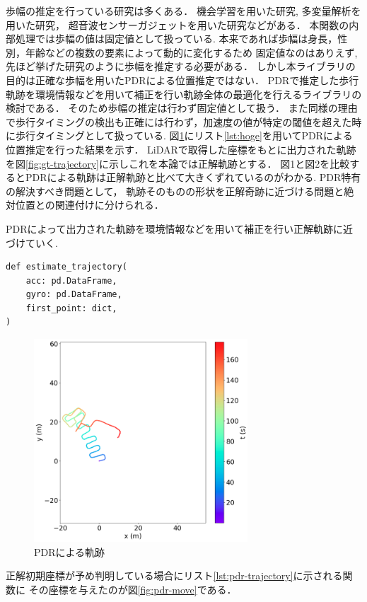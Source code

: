 \documentclass[Japanese]{dicomopapers}
\begin{document}
歩幅の推定を行っている研究は多くある．
機会学習を用いた研究\cite{stride-length-auto-learning},
多変量解析を用いた研究\cite{stride-length-multi}，
超音波センサーガジェットを用いた研究\cite{stride-length-ultrasonic}などがある．
本関数の内部処理では歩幅の値は固定値として扱っている.
本来であれば歩幅は身長，性別，年齢などの複数の要素によって動的に変化するため
固定値なのはありえず,先ほど挙げた研究のように歩幅を推定する必要がある．
しかし本ライブラリの目的は正確な歩幅を用いたPDRによる位置推定ではない．
PDRで推定した歩行軌跡を環境情報などを用いて補正を行い軌跡全体の最適化を行えるライブラリの検討である．
そのため歩幅の推定は行わず固定値として扱う．
また同様の理由で歩行タイミングの検出も正確には行わず，加速度の値が特定の閾値を超えた時に歩行タイミングとして扱っている.
図\ref{fig:pdr}にリスト\ref{lst:hoge}を用いてPDRによる位置推定を行った結果を示す．
LiDARで取得した座標をもとに出力された軌跡を図\ref{fig:gt-trajectory}に示しこれを本論では正解軌跡とする．
図1と図2を比較するとPDRによる軌跡は正解軌跡と比べて大きくずれているのがわかる.
PDR特有の解決すべき問題として，
軌跡そのものの形状を正解奇跡に近づける問題と絶対位置との関連付けに分けられる．


PDRによって出力された軌跡を環境情報などを用いて補正を行い正解軌跡に近づけていく.


\begin{lstlisting}[caption = {基本PDR}, label = {lst:pdr-trajectory}]
def estimate_trajectory(
    acc: pd.DataFrame,
    gyro: pd.DataFrame,
    first_point: dict,
) 
\end{lstlisting}

\begin{figure}[h]
	\centering
	\includegraphics[width=80mm]{image/pdr.jpg}
	\caption{PDRによる軌跡}    \label{fig:pdr}
\end{figure}

正解初期座標が予め判明している場合にリスト\ref{lst:pdr-trajectory}に示される関数に
その座標を与えたのが図\ref{fig:pdr-move}である．
\end{document}
